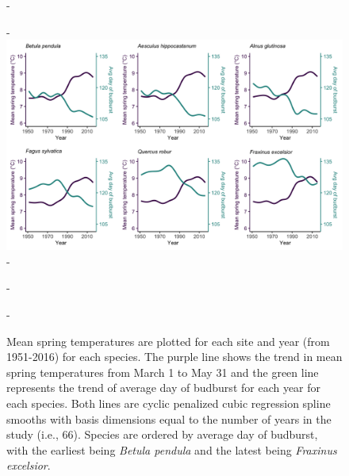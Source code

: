 \documentclass{article}\usepackage[]{graphicx}\usepackage[]{color}
\begin{document}
{\begin{figure} [H]
  -\begin{center}
  -\includegraphics[width=16cm]{..//analyses/figures/MSTBB_bySpp_lines.png}
  -\caption{Mean spring temperatures are plotted for each site and year (from 1951-2016) for each species. The purple line shows the trend in mean spring temperatures from March 1 to May 31 and the green line represents the trend of average day of budburst for each year for each species. Both lines are cyclic penalized cubic regression spline smooths with basis dimensions equal to the number of years in the study (i.e., 66). Species are ordered by average day of budburst, with the earliest being \textit{Betula pendula} and the latest being \textit{Fraxinus excelsior}. }\label{fig:mst}
  -\end{center}
  -\end{figure}}
\end{document}

